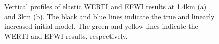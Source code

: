 \begin{figure}[!htb]
   \centering
   \caption{Vertical profiles of elastic WERTI and EFWI results at 1.4km (a) and
       3km (b). The black and blue lines indicate the true and linearly increased
       initial model. The green and yellow lines indicate the WERTI and EFWI results,
       respectively.
   }
   \label{fig:Profiles}
\end{figure}

